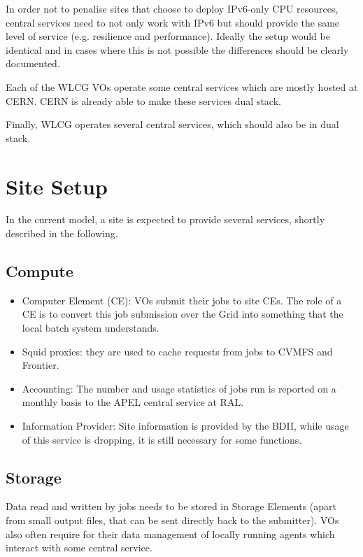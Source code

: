 \documentclass[11pt]{article}
\begin{document}
In order not to penalise sites that choose to deploy IPv6-only CPU
resources, central services need to not only work with IPv6 but should
provide the same level of service (e.g. resilience and performance).
Ideally the setup would be identical and in cases where this is not possible
the differences should be clearly documented.

Each of the WLCG VOs operate some central services which are mostly
hosted at CERN. CERN is already able to make these services dual
stack.

Finally, WLCG operates several central services, which should also be
in dual stack.

\section{Site Setup}
In the current model, a site is expected to provide several services, shortly described in the following.

\subsection{Compute}
\begin{itemize}
\item Computer Element (CE): VOs submit their jobs to site CEs.  The
  role of a CE is to convert this job submission over the Grid into
  something that the local batch system understands.
\item Squid proxies: they are used to cache requests from jobs to
  CVMFS and Frontier.
\item Accounting: The number and usage statistics of jobs run is
  reported on a monthly basis to the APEL central service at RAL.
\item Information Provider: Site information is provided by the BDII, while usage of this service is dropping, it is still necessary for some functions.
\end{itemize}

\subsection{Storage}
Data read and written by jobs needs to be stored in Storage Elements
(apart from small output files, that can be sent directly back to the
submitter). VOs also often require for their data management of
locally running agents which interact with some central service.

\end{document}
